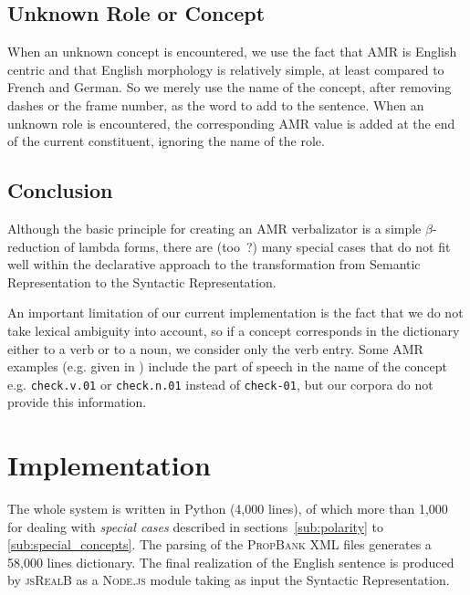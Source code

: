 \documentclass[12pt]{article}
\newcommand{\systeme}[1]{\textsc{#1}}
\newcommand{\jsr}{\systeme{jsRealB}}
\newcommand{\propbank}{\systeme{PropBank}}
\newcommand{\representation}[1]{\textsf{#1}}
\newcommand{\AMR}{\representation{AMR}}
\newcommand{\semr}{\representation{Semantic Representation}}
\newcommand{\syntr}{\representation{Syntactic Representation}}
\begin{document}
\subsection{Unknown Role or Concept} %
\label{sub:unknown_role_or_concept}
When an unknown concept is encountered, we use the fact that \AMR{} is English centric and that English morphology is relatively simple, at least compared to French and German. So we merely use the name of the concept, after removing dashes or the frame number, as the word to add to the sentence. When an unknown role is encountered, the corresponding \AMR{} value is added at the end of the current constituent, ignoring the name of the role.

\subsection{Conclusion} %
\label{sub:conclusion}
Although the basic principle for creating an \AMR{} verbalizator is a simple $\beta$-reduction of lambda forms, there are (too~?) many special cases that do not fit well within the declarative approach to the transformation from \semr{} to the \syntr{}.

An important limitation of our current implementation is the fact that we do not take lexical ambiguity into account, so if a concept corresponds in the dictionary either to a verb or to a noun, we consider only the verb entry. Some \AMR{} examples (e.g. given in \cite{Bos2019}) include the part of speech in the name of the concept e.g. \texttt{check.v.01} or \texttt{check.n.01} instead of \texttt{check-01}, but our corpora do not provide this information.



\section{Implementation} %
\label{sec:implementation}

The whole system is written in Python (4,000 lines), of which more than 1,000 for dealing with \emph{special cases} described in sections~\ref{sub:polarity} to \ref{sub:special_concepts}.  The parsing of the \propbank{} XML files generates a 58,000 lines dictionary. The final realization of the English sentence is produced by \jsr{} as a \systeme{Node.js} module taking as input the \syntr{}.
\end{document}
